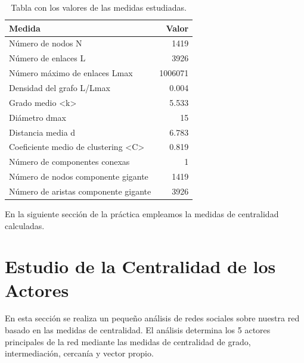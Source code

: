 \documentclass{uimppracticas}
\begin{document}
\begin{table}[H]
	\centering
	\begin{tabular}{|l|r|}
		\hline
		\textbf{Medida}                                            & \textbf{Valor} \\ \hline\hline
		Número de nodos N                                          & 1419           \\ \hline
		Número de enlaces L                                        & 3926           \\ \hline
		Número máximo de enlaces Lmax                              & 1006071        \\ \hline
		Densidad del grafo L/Lmax                                  & 0.004          \\ \hline
		Grado medio \textless{}k\textgreater{}                     & 5.533          \\ \hline
		Diámetro dmax                                              & 15             \\ \hline
		Distancia media d                                          & 6.783          \\ \hline
		Coeficiente medio de clustering \textless{}C\textgreater{} & 0.819          \\ \hline
		Número de componentes conexas                              & 1              \\ \hline
		Número de nodos componente gigante                         & 1419           \\ \hline
		Número de aristas componente gigante                       & 3926           \\ \hline
	\end{tabular}
	\caption{Tabla con los valores de las medidas estudiadas.}
	\label{tabla}
\end{table}

En la siguiente sección de la práctica empleamos la medidas de centralidad calculadas.

\newpage

\section*{Estudio de la Centralidad de los Actores}

En esta sección se realiza un pequeño análisis de redes sociales sobre nuestra red basado en las medidas de centralidad. El análisis determina los 5 actores principales de la red mediante las medidas de centralidad de grado, intermediación, cercanía y vector propio.
\end{document}
